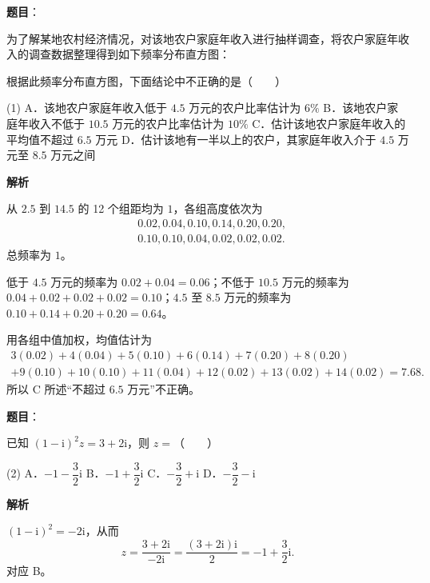 \begin{answer}

\textbf{题目}：

为了解某地农村经济情况，对该地农户家庭年收入进行抽样调查，将农户家庭年收入的调查数据整理得到如下频率分布直方图：
\nopagebreak[4]
\begin{center}\end{center}
\nopagebreak[4]
根据此频率分布直方图，下面结论中不正确的是\mbox{（　　）}

\begin{gkopts}(1)
\task A．该地农户家庭年收入低于 $4.5$ 万元的农户比率估计为 $6\%$
\task B．该地农户家庭年收入不低于 $10.5$ 万元的农户比率估计为 $10\%$
\task C．估计该地农户家庭年收入的平均值不超过 $6.5$ 万元
\task D．估计该地有一半以上的农户，其家庭年收入介于 $4.5$ 万元至 $8.5$ 万元之间
\end{gkopts}

\textbf{解析}

从 $2.5$ 到 $14.5$ 的 12 个组距均为 $1$，各组高度依次为
\nopagebreak[4]
\[
\begin{aligned}
&0.02,0.04,0.10,0.14,0.20,0.20,\\
&0.10,0.10,0.04,0.02,0.02,0.02.
\end{aligned}
\]
总频率为 $1$。

低于 $4.5$ 万元的频率为 $0.02+0.04=0.06$；不低于 $10.5$ 万元的频率为 $0.04+0.02+0.02+0.02=0.10$；$4.5$ 至 $8.5$ 万元的频率为 $0.10+0.14+0.20+0.20=0.64$。

用各组中值加权，均值估计为
\nopagebreak[4]
\[
\begin{aligned}
3(0.02)+4(0.04)+5(0.10)+6(0.14)+7(0.20)+8(0.20)\\
+9(0.10)+10(0.10)+11(0.04)+12(0.02)+13(0.02)+14(0.02)=7.68.
\end{aligned}
\]
所以 C 所述“不超过 $6.5$ 万元”不正确。


\end{answer}
\begin{answer}

\textbf{题目}：

已知 $(1-\mathrm i)^2z=3+2\mathrm i$，则 $z=$\mbox{（　　）}

\begin{gkopts}(2)
\task A．$-1-\dfrac32\mathrm i$
\task B．$-1+\dfrac32\mathrm i$
\task C．$-\dfrac32+\mathrm i$
\task D．$-\dfrac32-\mathrm i$
\end{gkopts}

\textbf{解析}

$(1-\mathrm i)^2=-2\mathrm i$，从而
\nopagebreak[4]
\[
z=\frac{3+2\mathrm i}{-2\mathrm i}
=\frac{(3+2\mathrm i)\mathrm i}{2}
=-1+\frac32\mathrm i.
\]
对应 B。


\end{answer}
